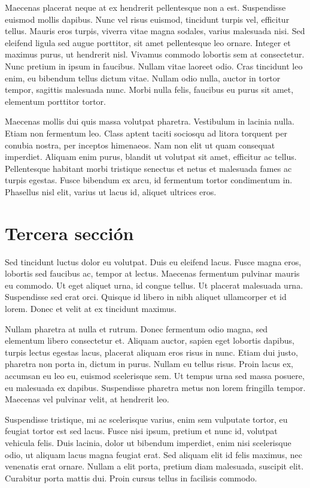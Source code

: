 Maecenas placerat neque at ex hendrerit pellentesque non a est. Suspendisse euismod mollis dapibus. Nunc vel risus euismod, tincidunt turpis vel, efficitur tellus. Mauris eros turpis, viverra vitae magna sodales, varius malesuada nisi. Sed eleifend ligula sed augue porttitor, sit amet pellentesque leo ornare. Integer et maximus purus, ut hendrerit nisl. Vivamus commodo lobortis sem at consectetur. Nunc pretium in ipsum in faucibus. Nullam vitae laoreet odio. Cras tincidunt leo enim, eu bibendum tellus dictum vitae. Nullam odio nulla, auctor in tortor tempor, sagittis malesuada nunc. Morbi nulla felis, faucibus eu purus sit amet, elementum porttitor tortor.

Maecenas mollis dui quis massa volutpat pharetra. Vestibulum in lacinia nulla. Etiam non fermentum leo. Class aptent taciti sociosqu ad litora torquent per conubia nostra, per inceptos himenaeos. Nam non elit ut quam consequat imperdiet. Aliquam enim purus, blandit ut volutpat sit amet, efficitur ac tellus. Pellentesque habitant morbi tristique senectus et netus et malesuada fames ac turpis egestas. Fusce bibendum ex arcu, id fermentum tortor condimentum in. Phasellus nisl elit, varius ut lacus id, aliquet ultrices eros.

\section{Tercera sección}
Sed tincidunt luctus dolor eu volutpat. Duis eu eleifend lacus. Fusce magna eros, lobortis sed faucibus ac, tempor at lectus. Maecenas fermentum pulvinar mauris eu commodo. Ut eget aliquet urna, id congue tellus. Ut placerat malesuada urna. Suspendisse sed erat orci. Quisque id libero in nibh aliquet ullamcorper et id lorem. Donec et velit at ex tincidunt maximus.

Nullam pharetra at nulla et rutrum. Donec fermentum odio magna, sed elementum libero consectetur et. Aliquam auctor, sapien eget lobortis dapibus, turpis lectus egestas lacus, placerat aliquam eros risus in nunc. Etiam dui justo, pharetra non porta in, dictum in purus. Nullam eu tellus risus. Proin lacus ex, accumsan eu leo eu, euismod scelerisque sem. Ut tempus urna sed massa posuere, eu malesuada ex dapibus. Suspendisse pharetra metus non lorem fringilla tempor. Maecenas vel pulvinar velit, at hendrerit leo.

Suspendisse tristique, mi ac scelerisque varius, enim sem vulputate tortor, eu feugiat tortor est sed lacus. Fusce nisi ipsum, pretium et nunc id, volutpat vehicula felis. Duis lacinia, dolor ut bibendum imperdiet, enim nisi scelerisque odio, ut aliquam lacus magna feugiat erat. Sed aliquam elit id felis maximus, nec venenatis erat ornare. Nullam a elit porta, pretium diam malesuada, suscipit elit. Curabitur porta mattis dui. Proin cursus tellus in facilisis commodo.

